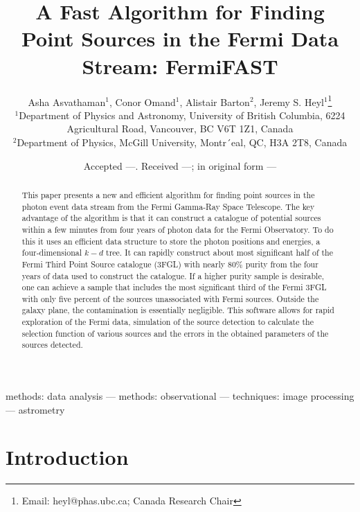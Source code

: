 \documentclass[useAMS,usenatbib]{mn2e}
\title[FermiFAST]{A Fast Algorithm for Finding Point Sources
in the Fermi Data Stream: FermiFAST}
\author[A. Asvathaman {\em et al.}]{Asha Asvathaman$^{1}$, Conor Omand$^{1}$, Alistair Barton$^{2}$,
  Jeremy S. Heyl$^{1}$\thanks{Email: heyl@phas.ubc.ca; Canada Research Chair} \\
$^{1}$Department of Physics and Astronomy, University of British
  Columbia, 6224 Agricultural Road, Vancouver, BC V6T 1Z1, Canada\\
$^{2}$Department of Physics, McGill University, Montr´eal, QC, H3A 2T8, Canada}
\begin{document}
\date{Accepted ---. Received ---; in original form ---}

\pagerange{\pageref{firstpage}--\pageref{lastpage}} 

\maketitle

\label{firstpage}

\begin{abstract}
  This paper presents a new and efficient algorithm for finding point
  sources in the photon event data stream from the Fermi Gamma-Ray
  Space Telescope.  The key advantage of the algorithm is that it can
  construct a catalogue of potential sources within a few minutes from
  four years of photon data for the Fermi Observatory.  To do this it
  uses an efficient data structure to store the photon positions and
  energies, a four-dimensional $k-d$ tree.  It can rapidly construct
  about most significant half of the Fermi Third Point Source
  catalogue (3FGL) with nearly 80\% purity from the four years of data
  used to construct the catalogue.  If a higher purity sample is
  desirable, one can achieve a sample that includes the most
  significant third of the Fermi 3FGL with only five percent of the
  sources unassociated with Fermi sources.  Outside the galaxy plane,
  the contamination is essentially negligible.  This software allows
  for rapid exploration of the Fermi data, simulation of the source
  detection to calculate the selection function of various sources and
  the errors in the obtained parameters of the sources detected.
\end{abstract}

\begin{keywords}
methods: data analysis --- methods: observational --- techniques:
image processing --- astrometry
\end{keywords}

\section{Introduction}
\end{document}
